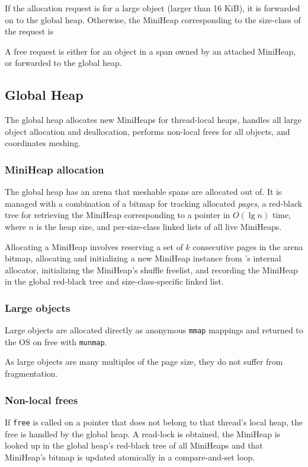 If the allocation request is for a large object (larger than 16 KiB),
it is forwarded on to the global heap.  Otherwise, the MiniHeap
corresponding to the size-class of the request is

A free request is either for an object in a span owned by an attached
MiniHeap, or forwarded to the global heap.

\subsection{Global Heap}

The global heap allocates new MiniHeaps for thread-local heaps,
handles all large object allocation and deallocation, performs
non-local frees for all objects, and coordinates meshing.

\subsubsection{MiniHeap allocation}

The global heap has an arena that meshable spans are allocated out of.
It is managed with a combination of a bitmap for tracking allocated
\textit{pages}, a red-black tree for retrieving the MiniHeap
corresponding to a pointer in $O(\lg{n})$ time, where $n$ is the heap
size, and per-size-class linked lists of all live MiniHeaps.

Allocating a MiniHeap involves reserving a set of $k$ consecutive
pages in the arena bitmap, allocating and initializing a new MiniHeap
instance from \Mesh's internal allocator, initializing the MiniHeap's
shuffle freelist, and recording the MiniHeap in the global red-black
tree and size-class-specific linked list.

\subsubsection{Large objects}

Large objects are allocated directly as anonymous \texttt{mmap}
mappings and returned to the OS on free with \texttt{munmap}.

As large objects are many multiples of the page size, they do not
suffer from fragmentation.

\subsubsection{Non-local frees}

If \texttt{free} is called on a pointer that does not belong to that
thread's local heap, the free is handled by the global heap.  A
read-lock is obtained, the MiniHeap is looked up in the global heap's
red-black tree of all MiniHeaps and that MiniHeap's bitmap is updated
atomically in a compare-and-set loop.

